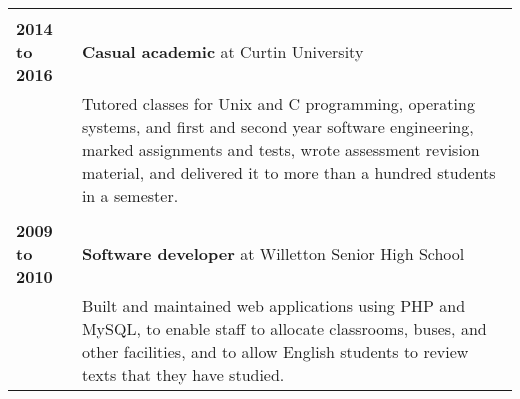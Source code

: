 \documentclass[a4paper,12pt]{article}
\begin{document}
\begin{tabular}{p{35mm}p{125mm}}
	\\              \\  \textbf{2014 to 2016}       & \textbf{Casual academic} at Curtin University
	\vspace{0.2em}  \\                              & Tutored classes for Unix and C programming, operating systems, and first and second year software engineering, marked assignments and tests, wrote assessment revision material, and delivered it to more than a hundred students in a semester.
	\\              \\  \textbf{2009 to 2010}       & \textbf{Software developer} at Willetton Senior High School
	\vspace{0.2em}  \\                              & Built and maintained web applications using PHP and MySQL, to enable staff to allocate classrooms, buses, and other facilities, and to allow English students to review texts that they have studied.
\end{tabular}
\end{document}

